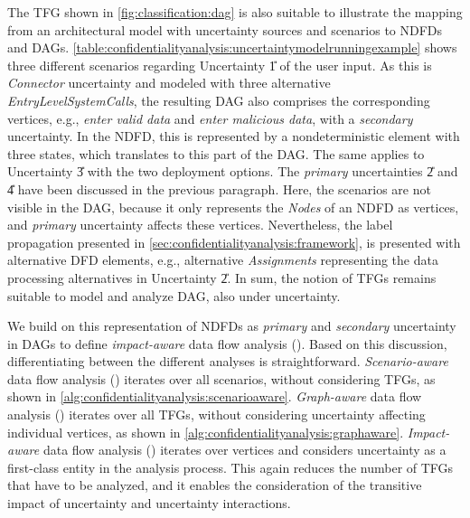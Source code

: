 The \ac{TFG} shown in \autoref{fig:classification:dag} is also suitable to illustrate the mapping from an architectural model with uncertainty sources and scenarios to \acp{NDFD} and \acp{DAG}.
\autoref{table:confidentialityanalysis:uncertaintymodelrunningexample} shows three different scenarios regarding Uncertainty \U{1} of the user input.
As this is \emph{Connector} uncertainty and modeled with three alternative \emph{EntryLevelSystemCalls}, the resulting \ac{DAG} also comprises the corresponding vertices, e.g., \emph{enter valid data} and \emph{enter malicious data}, with a \emph{secondary} uncertainty.
In the \ac{NDFD}, this is represented by a nondeterministic element with three states, which translates to this part of the \ac{DAG}.
The same applies to Uncertainty \U{3} with the two deployment options.
The \emph{primary} uncertainties \U{2} and \U{4} have been discussed in the previous paragraph.
Here, the scenarios are not visible in the \ac{DAG}, because it only represents the \emph{Nodes} of an \ac{NDFD} as vertices, and \emph{primary} uncertainty affects these vertices.
Nevertheless, the label propagation presented in \autoref{sec:confidentialityanalysis:framework}, is presented with alternative \ac{DFD} elements, e.g., alternative \emph{Assignments} representing the data processing alternatives in Uncertainty \U{2}.
In sum, the notion of \acp{TFG} remains suitable to model and analyze \ac{DAG}, also under uncertainty.

We build on this representation of \acp{NDFD} as \emph{primary} and \emph{secondary} uncertainty in \acp{DAG} to define \emph{impact-aware} data flow analysis ().
Based on this discussion, differentiating between the different analyses is straightforward.
\emph{Scenario-aware} data flow analysis () iterates over all scenarios, without considering \acp{TFG}, as shown in \autoref{alg:confidentialityanalysis:scenarioaware}.
\emph{Graph-aware} data flow analysis () iterates over all \acp{TFG}, without considering uncertainty affecting individual vertices, as shown in \autoref{alg:confidentialityanalysis:graphaware}.
\emph{Impact-aware} data flow analysis () iterates over vertices and considers uncertainty as a first-class entity in the analysis process.
This again reduces the number of \acp{TFG} that have to be analyzed, and it enables the consideration of the transitive impact of uncertainty and uncertainty interactions.

